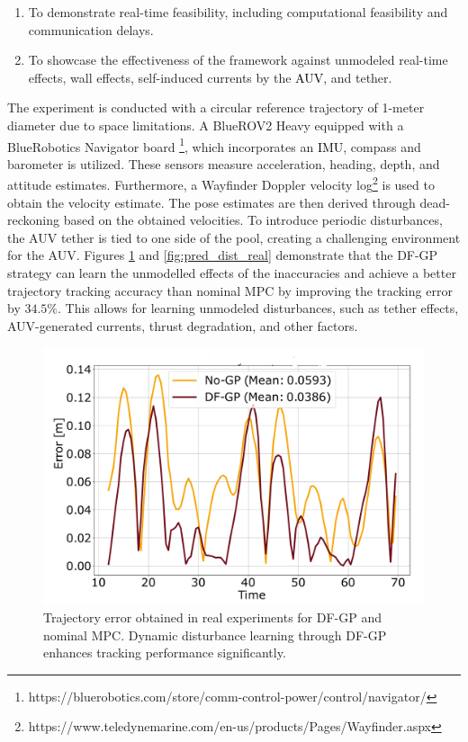 \begin{enumerate}
    \item To demonstrate real-time feasibility, including computational feasibility and communication delays.
    \item To showcase the effectiveness of the framework against unmodeled real-time effects, wall effects, self-induced currents by the \textcolor{black}{\ac{AUV}}, and tether.
\end{enumerate}
The experiment is conducted with a circular reference trajectory of 1-meter diameter due to space limitations. A BlueROV2 Heavy equipped with a BlueRobotics Navigator board \footnote{https://bluerobotics.com/store/comm-control-power/control/navigator/}, which incorporates an \textcolor{black}{\ac{IMU}}, compass and barometer is utilized. These sensors measure acceleration, heading, depth, and attitude estimates. Furthermore, a Wayfinder Doppler velocity log\footnote{https://www.teledynemarine.com/en-us/products/Pages/Wayfinder.aspx} is used to obtain the velocity estimate. The pose estimates are then derived through dead-reckoning based on the obtained velocities. To introduce periodic disturbances, the \ac{AUV} tether is tied to one side of the pool, creating a challenging environment for the \ac{AUV}.  %
Figures \ref{fig:error-real} and \ref{fig:pred_dist_real} demonstrate that the \ac{DF-GP} strategy can learn the unmodelled effects of the inaccuracies and achieve a better trajectory tracking accuracy than nominal \ac{MPC} by improving the tracking error by $34.5\%$. This allows for learning unmodeled disturbances, such as tether effects, \ac{AUV}-generated currents, thrust degradation, and other factors.


\begin{figure}[t]
	\centering	\includegraphics[width=0.7\linewidth]{figures/error_real.pdf}
	\caption{Trajectory error obtained in real experiments for  \ac{DF-GP} and nominal \ac{MPC}. Dynamic disturbance learning through \ac{DF-GP} enhances tracking performance significantly.}
	\label{fig:error-real}
\end{figure}


